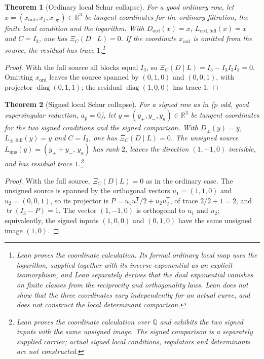 \documentclass[11pt]{article}
\newtheorem{theorem}{Theorem}[section]
\theoremstyle{definition}
\newcommand{\Q}{\mathbb{Q}}
\newcommand{\R}{\mathbb{R}}
\newcommand{\tr}{\operatorname{tr}}
\newcommand{\XiC}{\Xi_C(D\mid L)}        \newcommand{\KDD}{K_{DD}}
\begin{document}
\begin{theorem}[Ordinary local Schur collapse]\label{thm:apparatus:ordinary-schur-collapse}
For a good ordinary row, let $x=(x_{\mathrm{ord}},x_f,x_{\log})\in\R^3$ be
tangent coordinates for the ordinary filtration, the finite local
condition and the logarithm.  With
$D_{\mathrm{ord}}(x)=x$, $L_{\mathrm{ord,full}}(x)=x$ and $C=I_3$, one has
$\XiC=0$.  If the coordinate $x_{\mathrm{ord}}$ is omitted from the source,
the residual has trace $1$.\footnote{Lean proves the coordinate calculation.  Its formal ordinary
local map uses the logarithm, supplied together with its inverse
exponential as an explicit isomorphism, and Lean separately derives that
the dual exponential vanishes on finite classes from the reciprocity and
orthogonality laws.  Lean does not show that the three coordinates vary
independently for an actual curve, and does not construct the local
determinant comparison.}
\end{theorem}

\begin{proof}
With the full source all blocks equal $I_3$, so $\XiC=I_3-I_3I_3I_3=0$.
Omitting $x_{\mathrm{ord}}$ leaves the source spanned by $(0,1,0)$ and
$(0,0,1)$, with projector $\operatorname{diag}(0,1,1)$; the residual
$\operatorname{diag}(1,0,0)$ has trace $1$.
\end{proof}

\begin{theorem}[Signed local Schur collapse]\label{thm:apparatus:signed-schur-collapse}
For a signed row as in  ($p$ odd, good
supersingular reduction, $a_p=0$), let $y=(y_+,y_-,y_{\kappa})\in\R^3$ be
tangent coordinates for the two signed conditions and the signed
comparison.  With $D_{\pm}(y)=y$, $L_{\pm,\mathrm{full}}(y)=y$ and
$C=I_3$, one has $\XiC=0$.  The unsigned source
$L_{\mathrm{uns}}(y)=(y_++y_-,\,y_{\kappa})$ has rank $2$, leaves the
direction $(1,-1,0)$ invisible, and has residual trace $1$.\footnote{Lean proves the coordinate calculation over $\Q$ and exhibits the
two signed inputs with the same unsigned image.  The signed comparison is
a separately supplied carrier; actual signed local conditions, regulators
and determinants are not constructed.}
\end{theorem}

\begin{proof}
With the full source, $\XiC=0$ as in the ordinary case.  The unsigned
source is spanned by the orthogonal vectors $u_1=(1,1,0)$ and
$u_2=(0,0,1)$, so its projector is $P=u_1u_1^{\mathsf T}/2+u_2u_2^{\mathsf
T}$, of trace $2/2+1=2$, and $\tr(I_3-P)=1$.  The vector $(1,-1,0)$ is
orthogonal to $u_1$ and $u_2$; equivalently, the signed inputs
$(1,0,0)$ and $(0,1,0)$ have the same unsigned image $(1,0)$.
\end{proof}
\end{document}
